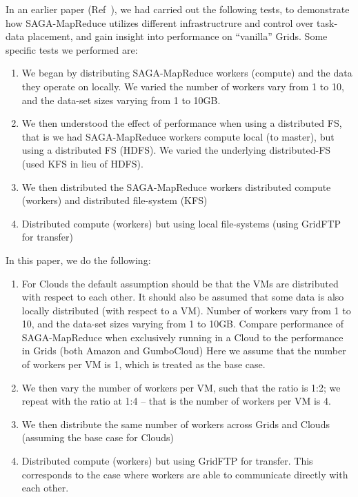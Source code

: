 \documentclass[conference,final]{IEEEtran}
\newcommand{\sagamapreduce }{SAGA-MapReduce }
\begin{document}
In an earlier paper (Ref~\cite{saga_ccgrid09}), we had carried out the
following tests, to demonstrate how \sagamapreduce utilizes different
infrastructrure and control over task-data placement, and gain insight
into performance on ``vanilla'' Grids. Some specific tests we
performed are:
\begin{enumerate}
\item We began by distributing \sagamapreduce workers (compute) and
  the data they operate on locally. We varied the number of workers
  vary from 1 to 10, and the data-set sizes varying from 1 to
  10GB. 
\item We then understood the effect of performance when using a
  distributed FS, that is we had \sagamapreduce workers compute local
  (to master), but using a distributed FS (HDFS). We varied
  the underlying distributed-FS (used KFS in lieu of HDFS).
\item We then distributed the \sagamapreduce workers distributed compute (workers) and distributed file-system (KFS)
\item Distributed compute (workers) but using local file-systems (using GridFTP for transfer)
\end{enumerate}

In this paper, we do the following:
\begin{enumerate}
\item For Clouds the default assumption should be that the VMs are
  distributed with respect to each other. It should also be assumed
  that some data is also locally distributed (with respect to a VM).
  Number of workers vary from 1 to 10, and the data-set sizes varying
  from 1 to 10GB.  Compare performance of \sagamapreduce when
  exclusively running in a Cloud to the performance in Grids (both
  Amazon and GumboCloud) Here we assume that the number of workers per
  VM is 1, which is treated as the base case.
\item We then vary the number of workers per VM, such that the ratio
  is 1:2; we repeat with the ratio at 1:4 -- that is the number of
  workers per VM is 4.
\item We then distribute the same number of workers across Grids and
  Clouds (assuming the base case for Clouds)
\item Distributed compute (workers) but using GridFTP for
  transfer. This corresponds to the case where workers are able to
  communicate directly with each other.
\end{enumerate}
\end{document}

